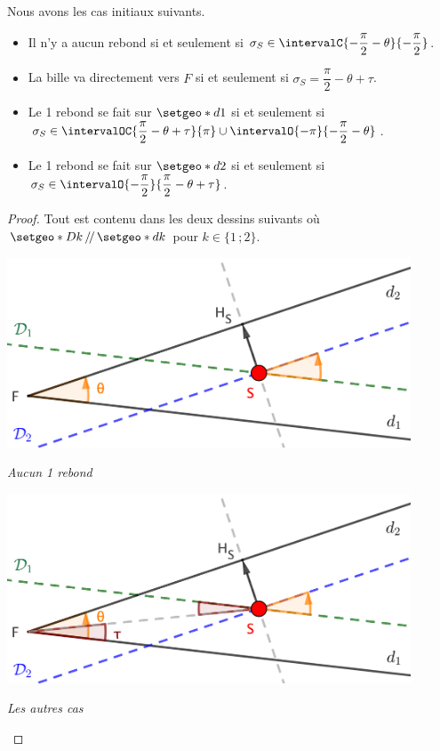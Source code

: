 \begin{fact}
	Nous avons les cas initiaux suivants.
	
	\begin{itemize}[label = \small\textbullet]
		\item Il n'y a aucun rebond si et seulement si $\sigma_S \in \intervalC{- \dfrac{\pi}{2} - \theta}{- \dfrac{\pi}{2}}$.
		
		\item La bille va directement vers $F$ si et seulement si $\sigma_S = \dfrac{\pi}{2} - \theta + \tau$.

		\item Le 1\ier{} rebond se fait sur $\setgeo*{d}{1}$ si et seulement si $\sigma_S \in \intervalOC{\dfrac{\pi}{2} - \theta + \tau}{\pi} \cup \intervalO{- \pi}{- \dfrac{\pi}{2} - \theta}$.

		\item Le 1\ier{} rebond se fait sur $\setgeo*{d}{2}$ si et seulement si $\sigma_S \in \intervalO{- \dfrac{\pi}{2}}{\dfrac{\pi}{2} - \theta + \tau}$.
	\end{itemize}

\end{fact}

\begin{proof}
	Tout est contenu dans les deux dessins suivants où $\setgeo*{D}{k} \, /\!/ \, \setgeo*{d}{k}$ pour $k \in \{ 1 \,; 2\}$.

	\medskip

	\begin{center}
		\includegraphics[width=12cm]{content/proof-no-bounce.png}

		\itshape\small
		Aucun 1\ier{} rebond
	\end{center}

	\medskip

	\begin{center}
		\includegraphics[width=12cm]{content/proof-1st-bounce-somewhere.png}

		\itshape\small
		Les autres cas
	\end{center}
\end{proof}


